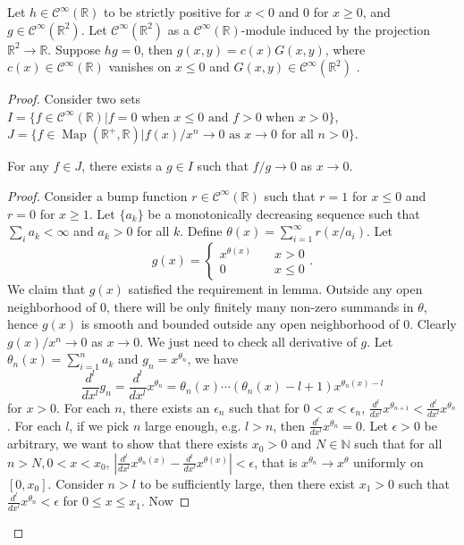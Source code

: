 \documentclass[10pt,a4paper]{amsart}
\newcommand{\N}{{\mathbb{N}}}
\newcommand{\R}{{\mathbb{R}}}
\newcommand{\cinf}{{\mathcal C}^{\infty}}
\newcommand{\map}{\operatorname{Map}}
\begin{document}
	 \begin{lem}\label{lem1} Let $h\in \cinf(\R)$ to be strictly positive for $x<0$ and 0 for $x \ge 0$, and $g\in \cinf(\R^2)$. Let $\cinf(\R^2)$ as a $\cinf(\R)$-module induced by the projection $\R^2 \to \R$. Suppose $hg =0$, then $g(x,y) = c(x)G(x, y)$, where $c(x) \in \cinf(\R)$ vanishes on $x\le 0$ and $G(x,y) \in \cinf(\R^2)$ .
	 	\end{lem}

 	\begin{proof}
 		Consider two sets $I = \{f\in \cinf(\R)|\text{$f=0$ when $x\le 0$ and $f> 0$ when $x> 0$} \}$, $J = \{f\in \map(\R^+, \R)| \text{$f(x)/x^n \to 0$ as $x\to 0$ for all $n>0$}\}$.
 		
 		\begin{lem} For any $f\in J$, there exists a $g\in I$ such that $f/g\to 0$ as $x\to 0$.
 			\end{lem}
 		\begin{proof}
 			Consider a bump function $r\in \cinf(\R)$ such that $r= 1$ for $x\le 0$ and $r=0$ for $x \ge 1$. Let $\{a_k\}$ be a monotonically decreasing sequence such that $\sum_i a_k < \infty$ and $a_k>0$ for all $k$. Define $\theta(x) = \sum_{i=1}^{\infty} r(x/a_i)$. Let 
 			\begin{equation}
 			g(x) = \begin{cases}
 			x^{\theta(x)} \quad &x>0\\
 			0 &x\le 0
 			\end{cases}.
 			\end{equation}
 			We claim that $g(x)$ satisfied the requirement in lemma. Outside any open neighborhood of $0$, there will be only finitely many non-zero summands in $\theta$, hence $g(x)$ is smooth and bounded outside any open neighborhood of $0$. Clearly $g(x)/x^n\to 0$ as $x\to 0$. We just need to check all derivative of $g$. Let $\theta_n(x) = \sum_{i=1}^n a_k$ and $g_n = x^{\theta_n}$, we have 
 			$$
 			\frac{d^l}{dx^l}g_n =\frac{d^l}{dx^l} x^{\theta_n} = \theta_n(x)\cdots(\theta_n(x)-l+1) x^{\theta_n(x) - l}
 			$$
 			for $x>0$. For each $n$, there exists an $\epsilon_n$ such that for $0<x<\epsilon_n$, $\frac{d^l}{dx^l} x^{\theta_{n+1}}<\frac{d^l}{dx^l} x^{\theta_n}$. For each $l$, if we pick $n$ large enough, e.g. $l >n$, then $\frac{d^l}{dx^l} x^{\theta_n} = 0$. Let $\epsilon>0$ be arbitrary, we want to show that there exists  $x_0>0$ and $N\in \N$ such that for all $n>N, 0<x<x_0$, $|\frac{d^l}{dx^l} x^{\theta_n(x)}-\frac{d^l}{dx^l} x^{\theta(x)}| < \epsilon$, that is $x^{\theta_n}\to x^{\theta}$ uniformly on $[0, x_0]$. Consider $n>l$ to be sufficiently large, then there exist $x_1> 0$ such that $\frac{d^l}{dx^l} x^{\theta_n} < \epsilon$ for $0\le x \le x_1$. Now

\end{proof}
\end{proof}
\end{document}
